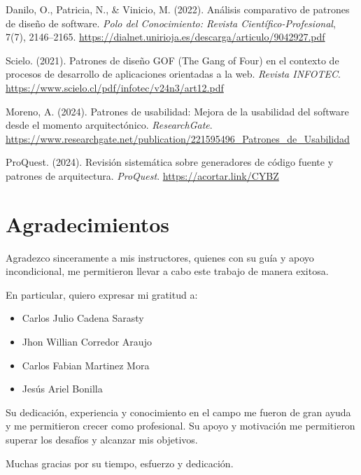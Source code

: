 \documentclass[twocolumn]{article}
\begin{document}
Danilo, O., Patricia, N., \& Vinicio, M. (2022). Análisis comparativo de patrones de diseño de software. \textit{Polo del Conocimiento: Revista Científico-Profesional}, 7(7), 2146–2165. \url{https://dialnet.unirioja.es/descarga/articulo/9042927.pdf}

Scielo. (2021). Patrones de diseño GOF (The Gang of Four) en el contexto de procesos de desarrollo de aplicaciones orientadas a la web. \textit{Revista INFOTEC}. \url{https://www.scielo.cl/pdf/infotec/v24n3/art12.pdf}

Moreno, A. (2024). Patrones de usabilidad: Mejora de la usabilidad del software desde el momento arquitectónico. \textit{ResearchGate}. \url{https://www.researchgate.net/publication/221595496_Patrones_de_Usabilidad}

ProQuest. (2024). Revisión sistemática sobre generadores de código fuente y patrones de arquitectura. \textit{ProQuest}. \url{https://acortar.link/CYBZ}

\section{Agradecimientos}

Agradezco sinceramente a mis instructores, quienes con su guía y apoyo incondicional, me permitieron llevar a cabo este trabajo de manera exitosa.

En particular, quiero expresar mi gratitud a:

\begin{itemize}
\item Carlos Julio Cadena Sarasty
\item Jhon Willian Corredor Araujo
\item Carlos Fabian Martinez Mora
\item Jesús Ariel Bonilla
\end{itemize}

Su dedicación, experiencia y conocimiento en el campo me fueron de gran ayuda y me permitieron crecer como profesional. Su apoyo y motivación me permitieron superar los desafíos y alcanzar mis objetivos.

Muchas gracias por su tiempo, esfuerzo y dedicación.
\end{document}
